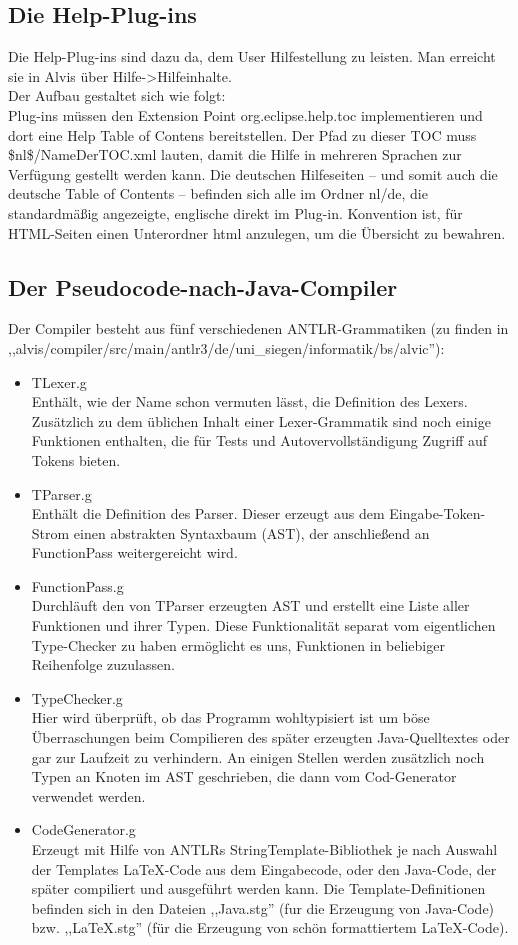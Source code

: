 \documentclass[10pt,a4paper,oneside]{scrbook}
\begin{document}
\subsection{Die Help-Plug-ins}
Die Help-Plug-ins sind dazu da, dem User Hilfestellung zu leisten. Man erreicht sie in Alvis über Hilfe->Hilfeinhalte.\\
Der Aufbau gestaltet sich wie folgt:\\
Plug-ins müssen den Extension Point org.eclipse.help.toc implementieren und dort eine Help Table of Contens bereitstellen.
Der Pfad zu dieser TOC muss \$nl\$/NameDerTOC.xml lauten, damit die Hilfe in mehreren Sprachen zur Verfügung gestellt werden kann.
Die deutschen Hilfeseiten -- und somit auch die deutsche Table of Contents -- befinden sich alle im Ordner nl/de, die 
standardmäßig angezeigte, englische direkt im Plug-in. Konvention ist, für HTML-Seiten einen Unterordner html anzulegen,
um die Übersicht zu bewahren.

\subsection{Der Pseudocode-nach-Java-Compiler}
Der Compiler besteht aus fünf verschiedenen ANTLR-Grammatiken (zu finden in \linebreak,,alvis/compiler/src/main/antlr3/de/uni\_siegen/informatik/bs/alvic''):
\begin{itemize}
  \item TLexer.g\\
    Enthält, wie der Name schon vermuten lässt, die Definition des Lexers. Zusätzlich zu dem üblichen Inhalt einer Lexer-Grammatik sind noch einige Funktionen enthalten, die für Tests und Autovervollständigung Zugriff auf Tokens bieten.
  \item TParser.g\\
    Enthält die Definition des Parser. Dieser erzeugt aus dem Eingabe-Token-Strom einen abstrakten Syntaxbaum (AST), der anschließend an FunctionPass weitergereicht wird.
  \item FunctionPass.g\\
    Durchläuft den von TParser erzeugten AST und erstellt eine Liste aller Funktionen und ihrer Typen. Diese Funktionalität separat vom eigentlichen Type-Checker zu haben ermöglicht es uns, Funktionen in beliebiger Reihenfolge zuzulassen.
  \item TypeChecker.g\\
    Hier wird überprüft, ob das Programm wohltypisiert ist um böse Überraschungen beim Compilieren des später erzeugten Java-Quelltextes oder gar zur Laufzeit zu verhindern. An einigen Stellen werden zusätzlich noch Typen an Knoten im AST geschrieben, die dann vom Cod-Generator verwendet werden.
  \item CodeGenerator.g\\
    Erzeugt mit Hilfe von ANTLRs StringTemplate-Bibliothek je nach Auswahl der Templates LaTeX-Code aus dem Eingabecode, oder den Java-Code, der später compiliert und ausgeführt werden kann.
    Die Template-Definitionen befinden sich in den Dateien ,,Java.stg'' (fur die Erzeugung von Java-Code) bzw. ,,LaTeX.stg'' (für die Erzeugung von schön formattiertem \LaTeX-Code).
\end{itemize}
\end{document}
